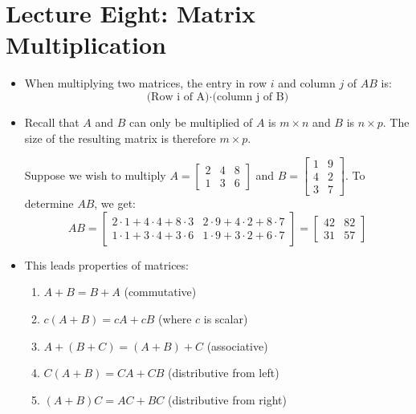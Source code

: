 \section{Lecture Eight: Matrix Multiplication}
\begin{itemize}
    \item When multiplying two matrices, the entry in row $i$ and column $j$ of $AB$ is:
    \begin{equation}
        \text{(Row i of A)} \cdot \text{(column j of B)}
    \end{equation}
    \item Recall that $A$ and $B$ can only be multiplied of $A$ is $m\times n$ and $B$ is $n\times p$. The size of the resulting matrix is therefore $m\times p$.
    \begin{example}
        Suppose we wish to multiply $A=\begin{bmatrix}
            2&4&8\\1&3&6
        \end{bmatrix}$ and $B=\begin{bmatrix}
            1&9 \\ 4&2 \\ 3&7
        \end{bmatrix}$. To determine $AB$, we get:
        \begin{equation}
            AB = \begin{bmatrix}
                2\cdot 1+4\cdot 4 + 8\cdot 3 & 2\cdot 9 + 4\cdot 2 + 8\cdot 7 \\ 
                1\cdot 1 + 3\cdot 4 + 3\cdot 6 & 1\cdot 9 + 3\cdot 2 + 6\cdot 7
            \end{bmatrix} = \begin{bmatrix}
                42 & 82 \\ 31 & 57
            \end{bmatrix}
            \label{eq:}
        \end{equation}
    \end{example}
    \item This leads properties of matrices:
    \begin{enumerate}
        \item $A+B=B+A$ (commutative)
        \item $c(A+B)=cA+cB$ (where $c$ is scalar)
        \item $A+(B+C)=(A+B)+C$ (associative)
        \item $C(A+B)=CA+CB$ (distributive from left)
        \item $(A+B)C=AC+BC$ (distributive from right)

\end{enumerate}
\end{itemize}
